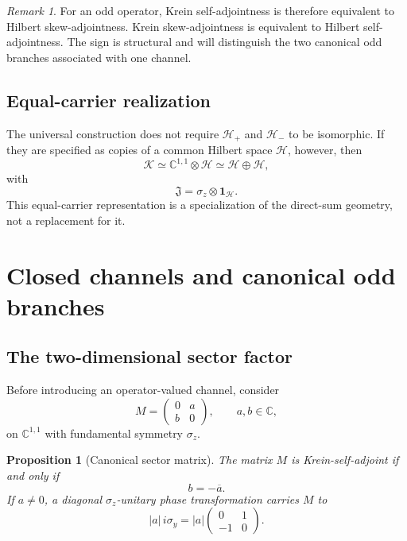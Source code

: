 \documentclass[11pt,reqno]{scrartcl}
\newcommand{\CC}{\mathbb C}
\newcommand{\scrK}{\mathscr K}
\newcommand{\scrHp}{\mathscr H_{+}}
\newcommand{\scrHm}{\mathscr H_{-}}
\newcommand{\fundJ}{\mathfrak J}
\newcommand{\idop}{\mathbf 1}
\theoremstyle{plain}
\newtheorem{proposition}[proposition]{Proposition}
\theoremstyle{definition}
\theoremstyle{remark}
\newtheorem{remark}[remark]{Remark}
\begin{document}
\begin{remark}
For an odd operator, Krein self-adjointness is therefore equivalent to
Hilbert skew-adjointness. Krein skew-adjointness is equivalent to Hilbert
self-adjointness. The sign is structural and will distinguish the two
canonical odd branches associated with one channel.
\end{remark}

\subsection{Equal-carrier realization}

The universal construction does not require \(\scrHp\) and \(\scrHm\) to be
isomorphic. If they are specified as copies of a common Hilbert space
\(\mathscr H\), however, then
\begin{equation}
  \scrK\simeq\CC^{1,1}\otimes\mathscr H
  \simeq\mathscr H\oplus\mathscr H,
\end{equation}
with
\begin{equation}
  \fundJ=\sigma_z\otimes\idop_{\mathscr H}.
\end{equation}
This equal-carrier representation is a specialization of the direct-sum
geometry, not a replacement for it.


\section{Closed channels and canonical odd branches}
\label{sec:classification}

\subsection{The two-dimensional sector factor}

Before introducing an operator-valued channel, consider
\begin{equation}
  M=
  \begin{pmatrix}
    0&a\\
    b&0
  \end{pmatrix},
  \qquad a,b\in\CC,
\end{equation}
on \(\CC^{1,1}\) with fundamental symmetry \(\sigma_z\).

\begin{proposition}[Canonical sector matrix]
\label{prop:canonical-sector}
The matrix \(M\) is Krein-self-adjoint if and only if
\begin{equation}
  b=-\overline a.
\end{equation}
If \(a\neq0\), a diagonal \(\sigma_z\)-unitary phase transformation carries
\(M\) to
\begin{equation}
  |a|\,i\sigma_y
  =|a|
  \begin{pmatrix}
    0&1\\
    -1&0
  \end{pmatrix}.
  \label{eq:i-sigma-y}
\end{equation}
\end{proposition}
\end{document}
